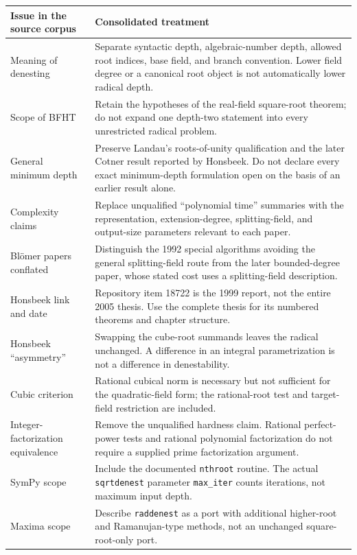 \documentclass[11pt,a4paper]{article}
\theoremstyle{definition}
\theoremstyle{remark}
\numberwithin{equation}{section}
\begin{document}
\begin{longtable}{P{0.27\textwidth}P{0.66\textwidth}}
\toprule
Issue in the source corpus & Consolidated treatment \\
\midrule\endhead
Meaning of denesting & Separate syntactic depth, algebraic-number depth, allowed root indices, base field, and branch convention. Lower field degree or a canonical root object is not automatically lower radical depth.\\
Scope of BFHT & Retain the hypotheses of the real-field square-root theorem; do not expand one depth-two statement into every unrestricted radical problem.\\
General minimum depth & Preserve Landau's roots-of-unity qualification and the later Cotner result reported by Honsbeek. Do not declare every exact minimum-depth formulation open on the basis of an earlier result alone.\\
Complexity claims & Replace unqualified ``polynomial time'' summaries with the representation, extension-degree, splitting-field, and output-size parameters relevant to each paper.\\
Bl\"omer papers conflated & Distinguish the 1992 special algorithms avoiding the general splitting-field route from the later bounded-degree paper, whose stated cost uses a splitting-field description.\\
Honsbeek link and date & Repository item 18722 is the 1999 report, not the entire 2005 thesis. Use the complete thesis for its numbered theorems and chapter structure.\\
Honsbeek ``asymmetry'' & Swapping the cube-root summands leaves the radical unchanged. A difference in an integral parametrization is not a difference in denestability.\\
Cubic criterion & Rational cubical norm is necessary but not sufficient for the quadratic-field form; the rational-root test and target-field restriction are included.\\
Integer-factorization equivalence & Remove the unqualified hardness claim. Rational perfect-power tests and rational polynomial factorization do not require a supplied prime factorization argument.\\
SymPy scope & Include the documented \texttt{nthroot} routine. The actual \texttt{sqrtdenest} parameter \texttt{max\_iter} counts iterations, not maximum input depth.\\
Maxima scope & Describe \texttt{raddenest} as a port with additional higher-root and Ramanujan-type methods, not an unchanged square-root-only port.\\

\end{longtable}
\end{document}
